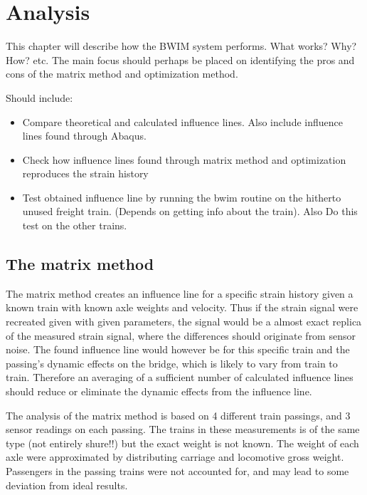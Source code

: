 \section{Analysis}

This chapter will describe how the BWIM system performs. What works? Why? How? etc.
The main focus should perhaps be placed on identifying the pros and cons of the matrix method and optimization method.

Should include:
\begin{itemize}
\item Compare theoretical and calculated influence lines. Also include influence lines found through Abaqus.
\item Check how influence lines found through matrix method and optimization reproduces the strain history
\item Test obtained influence line by running the bwim routine on the hitherto unused freight train. (Depends on getting info about the train). Also Do this test on the other trains.
\end{itemize}

\subsection{The matrix method}
The matrix method creates an influence line for a specific strain history given a known train with known axle weights and velocity. Thus if the strain signal were recreated given with given parameters, the signal would be a almost exact replica of the measured strain signal, where the differences should originate from sensor noise. The found influence line would however be for this specific train and the passing's dynamic effects on the bridge, which is likely to vary from train to train. Therefore an averaging of a sufficient number of calculated influence lines should reduce or eliminate the dynamic effects from the influence line.

The analysis of the matrix method is based on 4 different train passings, and 3 sensor readings on each passing. The trains in these measurements is of the same type (not entirely shure!!) but the exact weight is not known. The weight of each axle were approximated by distributing carriage and locomotive gross weight. Passengers in the passing trains were not accounted for, and may lead to some deviation from ideal results.


